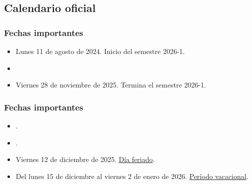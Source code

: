 \documentclass[12pt]{beamer}
\begin{document}
\subsection{Calendario oficial}

\begin{frame}
\frametitle{Fechas importantes}
\begin{itemize}[<+->]
\item Lunes 11 de agosto de 2024. Inicio del semestre 2026-1.
\item {}
\item Viernes 28 de noviembre de 2025. Termina el semestre 2026-1.
\end{itemize}
\end{frame}
\begin{frame}
\frametitle{Fechas importantes}
\begin{itemize}[<+->]
\item {}.
\item {}.
\item Viernes 12 de diciembre de 2025. \underline{Día feriado}.
\item Del lunes 15 de diciembre al viernes 2 de enero de 2026. \underline{Período vacacional}.
\end{itemize}
\end{frame}
\end{document}
